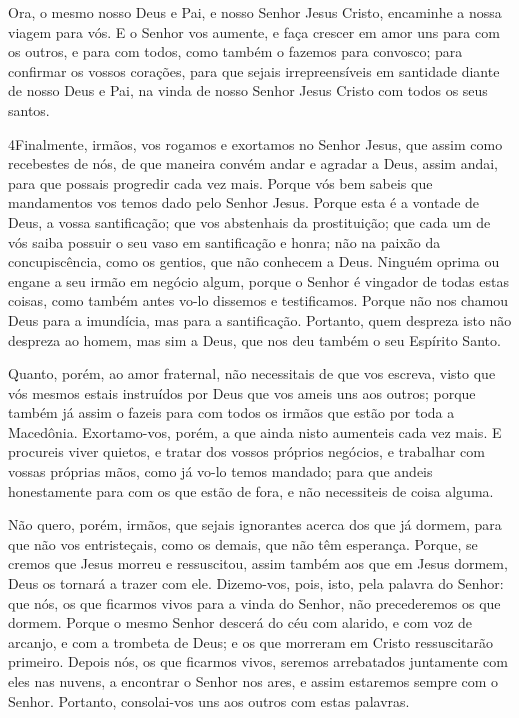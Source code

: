 Ora, o mesmo nosso Deus e Pai, e nosso Senhor Jesus Cristo,
encaminhe a nossa viagem para vós. E o Senhor vos aumente, e
faça crescer em amor uns para com os outros, e para com todos, como
também o fazemos para convosco; para confirmar os vossos
corações, para que sejais irrepreensíveis em santidade diante de
nosso Deus e Pai, na vinda de nosso Senhor Jesus Cristo com todos os
seus santos.

\medskip

\lettrine{4} Finalmente, irmãos, vos rogamos e exortamos no
Senhor Jesus, que assim como recebestes de nós, de que maneira
convém andar e agradar a Deus, assim andai, para que possais
progredir cada vez mais. Porque vós bem sabeis que mandamentos
vos temos dado pelo Senhor Jesus. Porque esta é a vontade de
Deus, a vossa santificação; que vos abstenhais da prostituição;
que cada um de vós saiba possuir o seu vaso em santificação e
honra; não na paixão da concupiscência, como os gentios, que não
conhecem a Deus. Ninguém oprima ou engane a seu irmão em negócio
algum, porque o Senhor é vingador de todas estas coisas, como também
antes vo-lo dissemos e testificamos. Porque não nos chamou Deus
para a imundícia, mas para a santificação. Portanto, quem
despreza isto não despreza ao homem, mas sim a Deus, que nos deu
também o seu Espírito Santo.

Quanto, porém, ao amor fraternal, não necessitais de que vos
escreva, visto que vós mesmos estais instruídos por Deus que vos
ameis uns aos outros; porque também já assim o fazeis para
com todos os irmãos que estão por toda a Macedônia. Exortamo-vos,
porém, a que ainda nisto aumenteis cada vez mais. E procureis
viver quietos, e tratar dos vossos próprios negócios, e trabalhar
com vossas próprias mãos, como já vo-lo temos mandado; para
que andeis honestamente para com os que estão de fora, e não
necessiteis de coisa alguma.

Não quero, porém, irmãos, que sejais ignorantes acerca dos que já
dormem, para que não vos entristeçais, como os demais, que não têm
esperança. Porque, se cremos que Jesus morreu e ressuscitou,
assim também aos que em Jesus dormem, Deus os tornará a trazer com
ele. Dizemo-vos, pois, isto, pela palavra do Senhor: que nós,
os que ficarmos vivos para a vinda do Senhor, não precederemos os
que dormem. Porque o mesmo Senhor descerá do céu com alarido,
e com voz de arcanjo, e com a trombeta de Deus; e os que morreram em
Cristo ressuscitarão primeiro. Depois nós, os que ficarmos
vivos, seremos arrebatados juntamente com eles nas nuvens, a
encontrar o Senhor nos ares, e assim estaremos sempre com o Senhor.
Portanto, consolai-vos uns aos outros com estas palavras.

